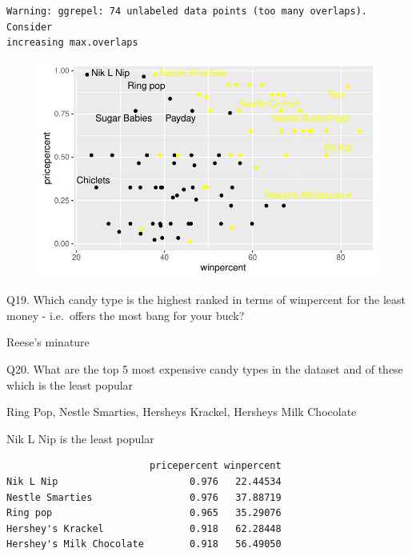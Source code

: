 \documentclass[
  letterpaper,
  DIV=11,
  numbers=noendperiod]{scrartcl}
\newenvironment{Shaded}{\begin{snugshade}}{\end{snugshade}}
\newcommand{\AttributeTok}[1]{\textcolor[rgb]{0.40,0.45,0.13}{#1}}
\newcommand{\ConstantTok}[1]{\textcolor[rgb]{0.56,0.35,0.01}{#1}}
\newcommand{\DecValTok}[1]{\textcolor[rgb]{0.68,0.00,0.00}{#1}}
\newcommand{\FunctionTok}[1]{\textcolor[rgb]{0.28,0.35,0.67}{#1}}
\newcommand{\NormalTok}[1]{\textcolor[rgb]{0.00,0.23,0.31}{#1}}
\newcommand{\OtherTok}[1]{\textcolor[rgb]{0.00,0.23,0.31}{#1}}
\newcommand{\SpecialCharTok}[1]{\textcolor[rgb]{0.37,0.37,0.37}{#1}}
\begin{document}
\begin{verbatim}
Warning: ggrepel: 74 unlabeled data points (too many overlaps). Consider
increasing max.overlaps
\end{verbatim}

\begin{figure}[H]

{\centering \includegraphics{Class-9_files/figure-pdf/unnamed-chunk-24-1.pdf}

}

\end{figure}

Q19. Which candy type is the highest ranked in terms of winpercent for
the least money - i.e.~offers the most bang for your buck?

Reese's minature

Q20. What are the top 5 most expensive candy types in the dataset and of
these which is the least popular

Ring Pop, Nestle Smarties, Hersheys Krackel, Hersheys Milk Chocolate

Nik L Nip is the least popular

\begin{Shaded}
\end{Shaded}

\begin{verbatim}
                         pricepercent winpercent
Nik L Nip                       0.976   22.44534
Nestle Smarties                 0.976   37.88719
Ring pop                        0.965   35.29076
Hershey's Krackel               0.918   62.28448
Hershey's Milk Chocolate        0.918   56.49050
\end{verbatim}
\end{document}
